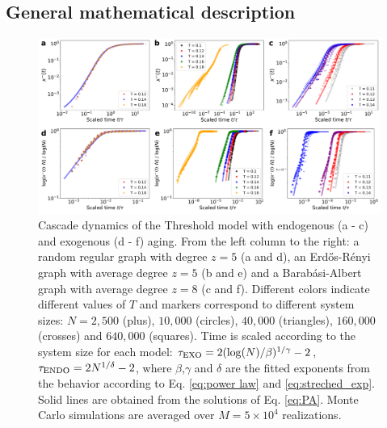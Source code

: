 \subsection{\label{subsec:Approximate master equation and solutions} General mathematical description}

\begin{figure}
    \centering \captionsetup{font=sf}
    \includegraphics[width=\linewidth]{Figs/Aging_Threshold/FIG_EVO_EXO_ENDO.pdf}
    \caption[Cascade dynamics of the Threshold model in graphs]{\label{fig:exo_endo_evo} Cascade dynamics of the Threshold model with endogenous (a - c) and exogenous (d - f) aging. From the left column to the right: a random regular graph with degree $z=5$ (a and d), an Erd\H{o}s-R\'enyi graph with average degree $z = 5$ (b and e) and a Barab\'asi-Albert graph with average degree $z = 8$ (c and f). Different colors indicate different values of $T$ and markers correspond to different system sizes: $N = 2,500$ (plus), $10,000$ (circles), $40,000$ (triangles), $160,000$ (crosses) and $640,000$ (squares). Time is scaled according to the system size for each model: $\tau_{\rm{EXO}} = 2(\log(N)/\beta)^{1/\gamma} - 2$, $\tau_{\rm{ENDO}} = 2N^{1/\delta} - 2$, where $\beta$,$\gamma$ and $\delta$ are the fitted exponents from the behavior according to Eq. \eqref{eq:power law} and \eqref{eq:streched_exp}. Solid lines are obtained from the solutions of Eq. \eqref{eq:PA}. Monte Carlo simulations are averaged over $M = 5 \times 10^4$ realizations.}
\end{figure}

